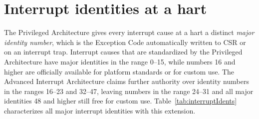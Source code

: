 \section{Interrupt identities at a hart}

The {\RISCV} Privileged Architecture gives every interrupt cause at a
hart a distinct \emph{major identity number}, which is the Exception
Code automatically written to CSR  or  on an
interrupt trap.
Interrupt causes that are standardized by the Privileged Architecture
have major identities in the range 0--15, while numbers 16 and higher
are officially available for platform standards or for custom use.
The Advanced Interrupt Architecture claims further authority over
identity numbers in the ranges 16--23 and 32--47, leaving numbers in the
range 24--31 and all major identities 48 and higher still free for custom
use.
Table~\ref{tab:interruptIdents} characterizes all major interrupt
identities with this extension.

